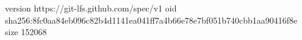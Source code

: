 version https://git-lfs.github.com/spec/v1
oid sha256:8fc0aa84eb096c82b4d1141ea041ff7a4b66e78e7bf051b740cbb1aa90416f8e
size 152068
